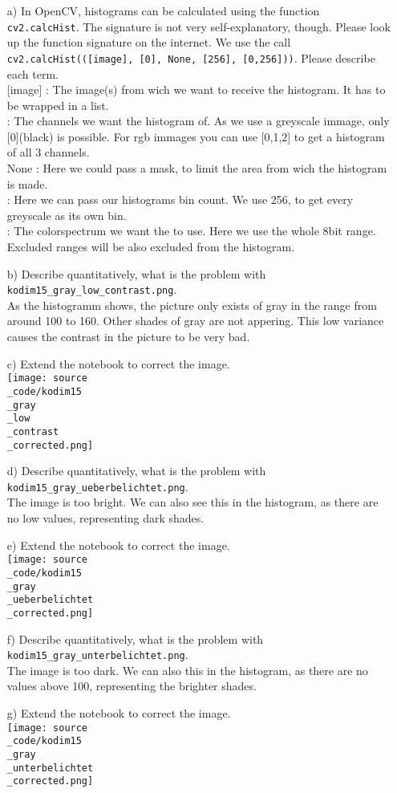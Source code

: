 \begin{enumerate}
\item[a)] In OpenCV, histograms can be calculated using the function \texttt{cv2.calcHist}. The signature is not very self-explanatory, though. Please look up
the function signature on the internet. We use the call \texttt{cv2.calcHist(([image], [0], None, [256], [0,256]))}. Please describe each term.\\

[image] : The image(s) from wich we want to receive the histogram. It has to be wrapped in a list.\\
[0] : The channels we want the histogram of. As we use a greyscale immage, only [0](black) is possible. For rgb immages you can use [0,1,2] to get a histogram of all 3 channels.\\
None : Here we could pass a mask, to limit the area from wich the histogram is made.\\
[256] : Here we can pass our histograms bin count. We use 256, to get every greyscale as its own bin.\\
[0,256] : The colorspectrum we want the to use. Here we use the whole 8bit range. Excluded ranges will be also excluded from the histogram.\\
\item[b)] Describe quantitatively, what is the problem with \texttt{kodim15\_gray\_low\_contrast.png}. \\

As the histogramm shows, the picture only exists of gray in the range from around 100 to 160. Other shades of gray are not appering. This low variance causes the contrast in the picture to be very bad.
\item[c)] Extend the notebook to correct the image. \\
\texttt{[image: source\\\_code/kodim15\\\_gray\\\_low\\\_contrast\\\_corrected.png]}

\item[d)] Describe quantitatively, what is the problem with \texttt{kodim15\_gray\_ueberbelichtet.png}. \\

The image is too bright. We can also see this in the histogram, as there are no low values, representing dark shades.
\item[e)] Extend the notebook to correct the image. \\
\texttt{[image: source\\\_code/kodim15\\\_gray\\\_ueberbelichtet\\\_corrected.png]}

\item[f)] Describe quantitatively, what is the problem with \texttt{kodim15\_gray\_unterbelichtet.png}. \\

The image is too dark. We can also this in the histogram, as there are no values above 100, representing the brighter shades.
\item[g)] Extend the notebook to correct the image. \\
\texttt{[image: source\\\_code/kodim15\\\_gray\\\_unterbelichtet\\\_corrected.png]}
\end{enumerate}


